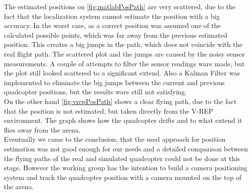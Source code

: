 The estimated positions on \ref{fig:matlabPosPath} are very scattered, due to the fact that the localization system cannot estimate the position with a big accuracy. In the worst case, as a correct position was assumed one of the calculated possible points, which was far away from the previous estimated position. This creates a big jumps in the path, which does not coincide with the real flight path. The scattered plot and the jumps are caused by the noisy sensor measurements. A couple of attempts to filter the sensor readings ware made, but the plot still looked scattered to a significant extend. Also a Kalman Filter was implemented to eliminate the big jumps between the current and previous quadcopter positions, but the results ware still not satisfying.\\
On the other hand \ref{fig:vrepPosPath} shows a clear flying path, due to the fact that the position is not estimated, but taken directly from the V-REP environment. The graph shows how the quadcopter drifts and to what extend it flies away from the arena.\\
Eventually we came to the conclusion, that the used approach for position estimation was not good enough for our needs and a detailed comparison between the flying paths of the real and simulated quadcopter could not be done at this stage. However the working group has the intention to build a camera positioning system and track the quadcopter position with a camera mounted on the top of the arena.


